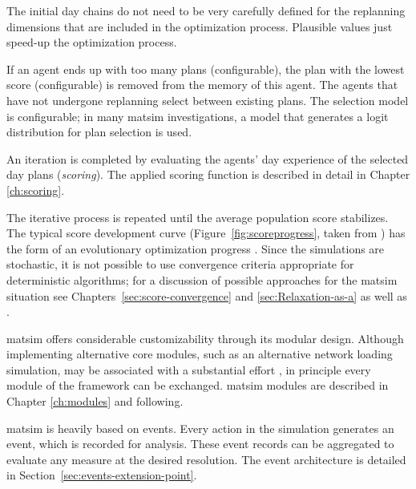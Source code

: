 The initial day chains do not need to be very carefully defined for the replanning dimensions that are included in the optimization process. Plausible values just speed-up the optimization process. 

If an agent ends up with too many plans (configurable), the plan with the lowest score (configurable) is removed from the memory of this agent. The agents that have not undergone replanning select between existing plans. The selection model is configurable; in many \gls{matsim} investigations, a model that generates a logit distribution for plan selection is used.

An iteration is completed by evaluating the agents' day experience of the selected day plans (\emph{scoring}). The applied scoring function is described in detail in Chapter \ref{ch:scoring}.

The iterative process is repeated until the average population score stabilizes.
The typical score development curve (Figure~\ref{fig:scoreprogress}, taken from \citet[][]{HorniEtAl_TRR_2009}) has the form of an evolutionary optimization progress \citep[][Figure~2.5]{EibenSmithJE_2003}.  Since the simulations are stochastic, it is not possible to use convergence criteria appropriate for deterministic algorithms; for a discussion of possible approaches for the \gls{matsim} situation see Chapters~\ref{sec:score-convergence} and \ref{sec:Relaxation-as-a} as well as \citet{Meister_PhDThesis_2011}.

\gls{matsim} offers considerable customizability through its modular design. Although %
implementing alternative core modules, such as an alternative network loading simulation, may be associated with a substantial effort \citep[][Section 2.4]{MATSim_Userguide_2015}, in principle every module of the framework can be exchanged. \gls{matsim} modules are described in Chapter \ref{ch:modules} and following.

\gls{matsim} is heavily based on events. Every action in the simulation generates an event, which is recorded for analysis. These event records can be aggregated to evaluate any measure at the desired resolution. The event architecture is detailed in Section~\ref{sec:events-extension-point}.

